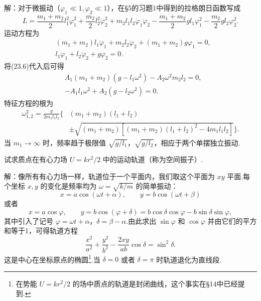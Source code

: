 \begin{xiti}
解：对于微振动（$\varphi_1\ll1,\varphi_2\ll1$），在§5的习题1中得到的拉格朗日函数写成
\begin{equation*}
  L=\frac{m_1+m_2}{2}l_1^2\dot{\varphi}_1^2
  +\frac{m_2}{2}l_2^2\dot{\varphi}_2^2
  +m_2l_1l_2\dot{\varphi}_1\dot{\varphi}_2
  -\frac{m_1+m_2}{2}gl_1\varphi_1^2-\frac{m_2}{2}gl_2\varphi_2^2.
\end{equation*}
运动方程为
\begin{equation*}
\begin{aligned}
  &\left(m_1+m_2\right)l_1\ddot{\varphi}_1+m_2l_2\ddot{\varphi}_2
  +\left(m_1+m_2\right)g\varphi_1=0,\\
  &l_1\ddot{\varphi}_1+l_2\ddot{\varphi}_2+g\varphi_2=0.
\end{aligned}
\end{equation*}
将(23.6)代入后可得
\begin{equation*}
\begin{aligned}
  &A_1\left(m_1+m_2\right)\left(g-l_1\omega^2\right)-A_2\omega^2m_2l_2=0,\\
  &-A_1l_1\omega^2+A_2\left(g-l_2\omega^2\right)=0.
\end{aligned}
\end{equation*}
特征方程的根为
\begin{equation*}
\begin{aligned}
  \omega_{1,2}^2=\frac{g}{2m_1l_1l_2}\bigg\{&\left(m_1+m_2\right)\left(l_1+l_2\right)\\
  &\pm\sqrt{\left(m_1+m_2\right)\left[\left(m_1+m_2\right)\left(l_1+l_2\right)^2-4m_1l_1l_2\right]}\bigg\}.
\end{aligned}
\end{equation*}
当 $m_1\to\infty$ 时，频率趋于极限值 $\sqrt{g/l_1}$，$\sqrt{g/l_2}$，相应于两个单摆独立振动.

\quad 试求质点在有心力场 $U=kr^2/2$ 中的运动轨道（称为空间振子）.

解：像所有有心力场一样，轨道位于一个平面内，我们取这个平面为 $xy$ 平面.每个坐标 $x,y$ 的变化是频率均为 $\omega=\sqrt{k/m}$ 的简单振动：
\begin{equation*}
  x=a\cos(\omega t+\alpha),\qquad
  y=b\cos(\omega t+\beta)
\end{equation*}
或者
\begin{equation*}
  x=a\cos\varphi,\qquad
  y=b\cos(\varphi+\delta)=b\cos\delta\cos\varphi-b\sin\delta\sin\varphi,
\end{equation*}
其中引入了记号 $\varphi=\omega t+\alpha$，$\delta=\beta-\alpha$.由此求出 $\sin\varphi$ 和 $\cos\varphi$ 并由它们的平方和等于1，可得轨道方程
\begin{equation*}
  \frac{x^2}{a^2}+\frac{y^2}{b^2}-\frac{2xy}{ab}\cos\delta=\sin^2\delta.
\end{equation*}
这是中心在坐标原点的椭圆\footnote{在势能 $U=kr^2/2$ 的场中质点的轨道是封闭曲线，这个事实在§14中已经提到.}.当 $\delta=0$ 或者 $\delta=\pi$ 时轨道退化为直线段.

\end{xiti}

